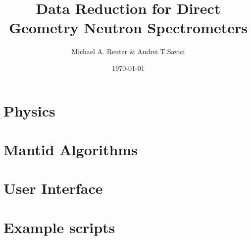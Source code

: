 \documentclass[11pt]{article}
\numberwithin{equation}{section}
\numberwithin{figure}{section}
\begin{document}
\title{Data Reduction for Direct Geometry Neutron Spectrometers}
\author{Michael A. Reuter \& Andrei T.Savici}
\date{\today}
\maketitle

\section{Physics}\label{sec:Physics}

\section{Mantid Algorithms}\label{sec:Algs}

\section{User Interface}\label{sec:UI}

\section{Example scripts}\label{sec:Examples}

\end{document}

